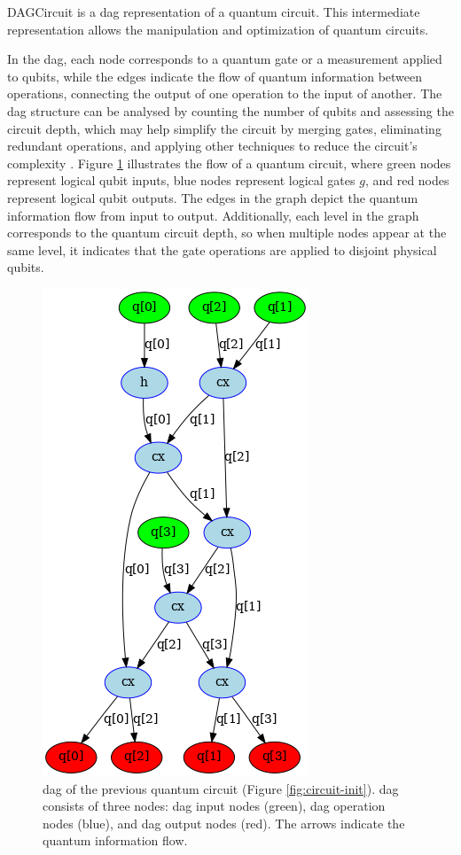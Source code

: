 \begin{definition}
    DAGCircuit \cite{ibmquantum_dagcircuit} is a \acrfull{dag} representation of a quantum circuit. This intermediate representation allows the manipulation and optimization of quantum circuits.
\end{definition}
In the \acrshort{dag}, each node corresponds to a quantum gate or a measurement applied to qubits, while the edges indicate the flow of quantum information between operations, connecting the output of one operation to the input of another. The \acrshort{dag} structure can be analysed by counting the number of qubits and assessing the circuit depth, which may help simplify the circuit by merging gates, eliminating redundant operations, and applying other techniques to reduce the circuit's complexity \cite{li_tackling_2019}. Figure \ref{fig:dag-embeded} illustrates the flow of a quantum circuit, where green nodes represent logical qubit inputs, blue nodes represent logical gates $g$, and red nodes represent logical qubit outputs. The edges in the graph depict the quantum information flow from input to output. Additionally, each level in the graph corresponds to the quantum circuit depth, so when multiple nodes appear at the same level, it indicates that the gate operations are applied to disjoint physical qubits.
\begin{figure}[h]
    \centering
    \includegraphics[width=0.3\linewidth]{image/dag_embeded.png}
    \caption{\acrfull{dag} of the previous quantum circuit (Figure \ref{fig:circuit-init}). \acrshort{dag} consists of three nodes: \acrshort{dag} input nodes (green), \acrshort{dag} operation nodes (blue), and \acrshort{dag} output nodes (red). The arrows indicate the quantum information flow.}
    \label{fig:dag-embeded}
\end{figure}

